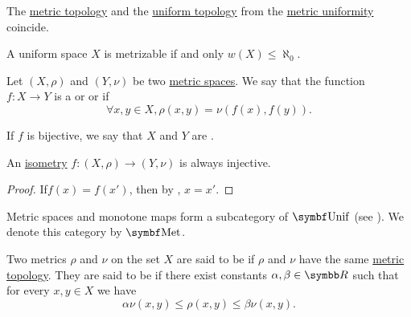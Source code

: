 \begin{proposition}\label{thm:metric_topology_coincides_with_uniform_topology}
  The \hyperref[def:metric_topology]{metric topology} and the \hyperref[def:uniform_topology]{uniform topology} from the \hyperref[def:metric_uniformity]{metric uniformity} coincide.
\end{proposition}

\begin{theorem}\label{thm:countable_uniform_base_implies_metrizable}
  A uniform space \( X \) is metrizable if and only \( w(X) \leq \aleph_0 \).
\end{theorem}

\medskip

\begin{definition}\label{def:isometry}
  Let \( (X, \rho) \) and \( (Y, \nu) \) be two \hyperref[def:metric_space]{metric spaces}. We say that the function \( f: X \to Y \) is a  or  or  if
  \begin{equation*}
    \forall x, y \in X, \rho(x, y) = \nu(f(x), f(y)).
  \end{equation*}

  If \( f \) is bijective, we say that \( X \) and \( Y \) are .
\end{definition}

\begin{proposition}\label{thm:isometry_is_injective}
  An \hyperref[def:isometry]{isometry} \( f: (X, \rho) \to (Y, \nu) \) is always injective.
\end{proposition}
\begin{proof}
  If\LEM \( f(x) = f(x') \), then by , \( x = x' \).
\end{proof}

\begin{definition}\label{def:category_of_metric_spaces}
  Metric spaces and monotone maps form a subcategory of \( \Cat{Unif} \) (see ). We denote this category by \( \Cat{Met} \).
\end{definition}

\begin{definition}\label{def:equivalent_metrics}
  Two metrics \( \rho \) and \( \nu \) on the set \( X \) are said to be  if \( \rho \) and \( \nu \) have the same \hyperref[def:metric_topology]{metric topology}. They are said to be  if there exist constants \( \alpha, \beta \in \BR \) such that for every \( x, y \in X \) we have
  \begin{equation*}
    \alpha \nu(x, y) \leq \rho(x, y) \leq \beta \nu(x, y).
  \end{equation*}
\end{definition}

